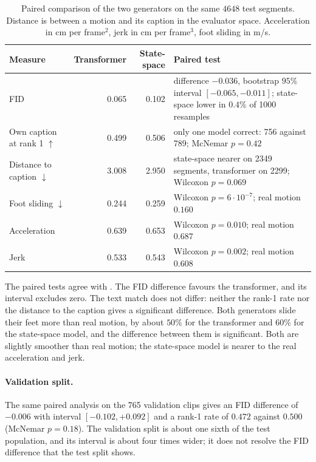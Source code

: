 \begin{table}[H]
\centering
\caption{Paired comparison of the two generators on the same $4648$ test segments. Distance is between a motion and its caption in the evaluator space. Acceleration in cm per frame$^2$, jerk in cm per frame$^3$, foot sliding in m/s.}
\label{tab:twin_paired}
\begin{tabular}{p{}rrp{}}
\toprule
Measure & Transformer & State-space & Paired test \\
\midrule
FID & 0.065 & 0.102 & difference $-0.036$, bootstrap $95\%$ interval $[-0.065, -0.011]$; state-space lower in $0.4\%$ of 1000 resamples \\
\addlinespace
Own caption at rank 1 $\uparrow$ & 0.499 & 0.506 & only one model correct: 756 against 789; McNemar $p = 0.42$ \\
\addlinespace
Distance to caption $\downarrow$ & 3.008 & 2.950 & state-space nearer on 2349 segments, transformer on 2299; Wilcoxon $p = 0.069$ \\
\addlinespace
Foot sliding $\downarrow$ & 0.244 & 0.259 & Wilcoxon $p = 6 \cdot 10^{-7}$; real motion $0.160$ \\
\addlinespace
Acceleration & 0.639 & 0.653 & Wilcoxon $p = 0.010$; real motion $0.687$ \\
\addlinespace
Jerk & 0.533 & 0.543 & Wilcoxon $p = 0.002$; real motion $0.608$ \\
\bottomrule
\end{tabular}
\end{table}

The paired tests agree with . The FID difference favours the transformer, and its interval excludes zero. The text match does not differ: neither the rank-1 rate nor the distance to the caption gives a significant difference. Both generators slide their feet more than real motion, by about $50\%$ for the transformer and $60\%$ for the state-space model, and the difference between them is significant. Both are slightly smoother than real motion; the state-space model is nearer to the real acceleration and jerk.

\paragraph{Validation split.} The same paired analysis on the 765 validation clips gives an FID difference of $-0.006$ with interval $[-0.102, +0.092]$ and a rank-1 rate of $0.472$ against $0.500$ (McNemar $p = 0.18$). The validation split is about one sixth of the test population, and its interval is about four times wider; it does not resolve the FID difference that the test split shows.


